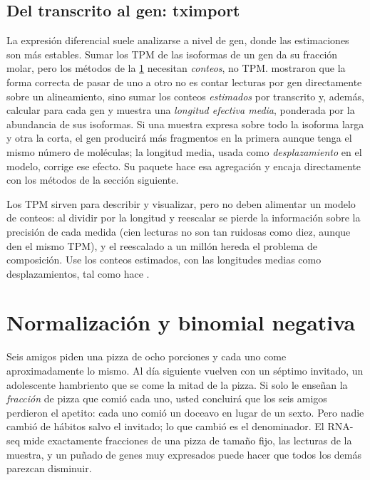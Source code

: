 \subsection{Del transcrito al gen: tximport}

La expresión diferencial suele analizarse a nivel de gen, donde las estimaciones son más estables. Sumar los TPM de las isoformas de un gen da su fracción molar, pero los métodos de la \cref{sec:11-norm} necesitan \emph{conteos}, no TPM. \textcite{c11-soneson2015} mostraron que la forma correcta de pasar de uno a otro no es contar lecturas por gen directamente sobre un alineamiento, sino sumar los conteos \emph{estimados} por transcrito y, además, calcular para cada gen y muestra una \emph{longitud efectiva media}, ponderada por la abundancia de sus isoformas. Si una muestra expresa sobre todo la isoforma larga y otra la corta, el gen producirá más fragmentos en la primera aunque tenga el mismo número de moléculas; la longitud media, usada como \emph{desplazamiento} en el modelo, corrige ese efecto. Su paquete  hace esa agregación y encaja directamente con los métodos de la sección siguiente.

\begin{cuidado}
Los TPM sirven para describir y visualizar, pero no deben alimentar un modelo de conteos: al dividir por la longitud y reescalar se pierde la información sobre la precisión de cada medida (cien lecturas no son tan ruidosas como diez, aunque den el mismo TPM), y el reescalado a un millón hereda el problema de composición. Use los conteos estimados, con las longitudes medias como desplazamientos, tal como hace .
\end{cuidado}

\section{Normalización y binomial negativa}\label{sec:11-norm}

\begin{intuicion}
Seis amigos piden una pizza de ocho porciones y cada uno come aproximadamente lo mismo. Al día siguiente vuelven con un séptimo invitado, un adolescente hambriento que se come la mitad de la pizza. Si solo le enseñan la \emph{fracción} de pizza que comió cada uno, usted concluirá que los seis amigos perdieron el apetito: cada uno comió un doceavo en lugar de un sexto. Pero nadie cambió de hábitos salvo el invitado; lo que cambió es el denominador. El RNA-seq mide exactamente fracciones de una pizza de tamaño fijo, las lecturas de la muestra, y un puñado de genes muy expresados puede hacer que todos los demás parezcan disminuir.
\end{intuicion}

